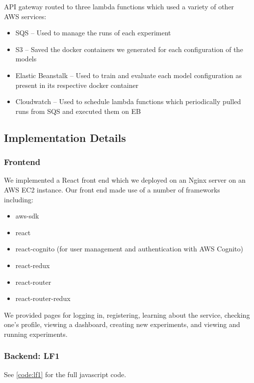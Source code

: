\documentclass[12pt,oneside]{amsart}
\begin{document}
\begin{multicols}{2}
API gateway routed to three lambda functions which used a variety of other AWS services:

\begin{itemize}
  \item SQS -- Used to manage the runs of each experiment
  \item S3 -- Saved the docker containers we generated for each configuration of the models
  \item Elastic Beanstalk -- Used to train and evaluate each model configuration as present in its respective docker container
  \item Cloudwatch -- Used to schedule lambda functions which periodically pulled runs from SQS and executed them on EB
\end{itemize}

\subsection{Implementation Details} \label{ch:solidity_work}

\end{multicols}
\subsubsection{Frontend}
We implemented a React front end which we deployed on an Nginx server on an AWS EC2 instance.
Our front end made use of a number of frameworks including:

\begin{itemize}
  \item aws-sdk
  \item react
  \item react-cognito (for user management and authentication with AWS Cognito)
  \item react-redux
  \item react-router
  \item react-router-redux
\end{itemize}

We provided pages for logging in, registering, learning about the service, checking one's profile, viewing a dashboard, creating new experiments, and viewing and running experiments.

\subsubsection{Backend: LF1}
See \ref{code:lf1} for the full javascript code.
\end{document}
